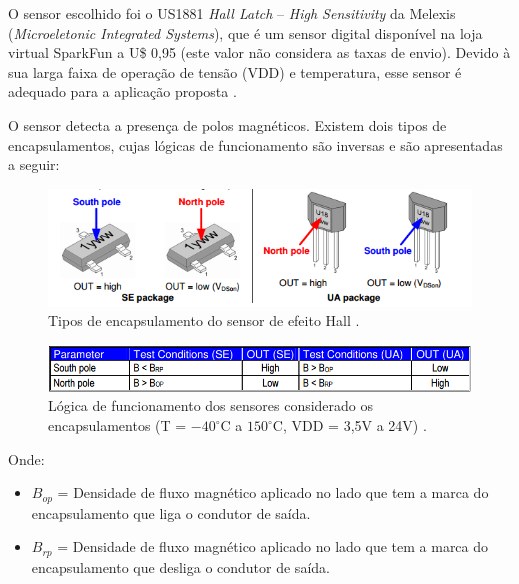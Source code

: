 	O sensor escolhido foi o US1881 \textit{Hall Latch} – \textit{High Sensitivity} da Melexis
	(\textit{Microeletonic Integrated Systems}), que é um sensor
	digital disponível na loja virtual SparkFun a U\$ 0,95 (este valor não considera as taxas de envio). Devido à sua larga
	faixa de operação de tensão (VDD) e temperatura, esse sensor é adequado para a aplicação proposta \cite{melexis}.
	
	O sensor detecta a presença de polos magnéticos. Existem dois tipos de encapsulamentos, cujas lógicas de funcionamento
	são inversas e são apresentadas a seguir:
	
	\begin{figure}[!htbp]
	  \centering
	  \includegraphics[scale=0.4]{editaveis/figuras/encapsulamento_sensor_efeito_hall}
	  \caption[Tipos de encapsulamento do sensor de efeito Hall]{Tipos de encapsulamento do sensor de efeito Hall \cite{melexis}.}
	  \label{encapsulamento_sensor_efeito_hall}
	\end{figure}
	
	\begin{figure}[!htbp]
	  \centering
	  \includegraphics[scale=0.5]{editaveis/figuras/funcionamento_sensores_encapsulamento}
	  \caption[Lógica de funcionamento dos sensores considerado os encapsulamentos]
	  {Lógica de funcionamento dos sensores considerado os encapsulamentos (T = $-40^\circ\mathrm{C}$ a $150^\circ\mathrm{C}$, VDD = 3,5V a 24V) \cite{melexis}.}
	  \label{funcionamento_sensores_encapsulamento}
	\end{figure}
	
	Onde:
	
	\begin{itemize}
	 \item $B_{op}$ = Densidade de fluxo magnético aplicado no lado que tem a marca do encapsulamento que liga o condutor de saída.
	 \item $B_{rp}$ = Densidade de fluxo magnético aplicado no lado que tem a marca do encapsulamento que desliga o condutor de saída.
	\end{itemize}
	
